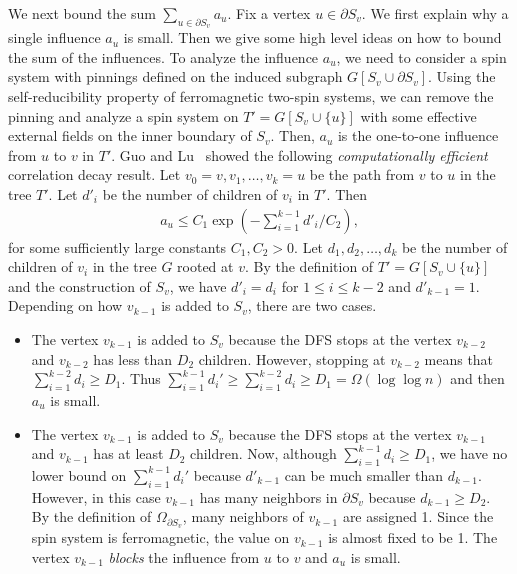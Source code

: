 \documentclass[11pt]{amsart}
\theoremstyle{definition}
\theoremstyle{remark}
\begin{document}
We next bound the sum $\sum_{u \in \partial S_v} a_u$. Fix a vertex $u \in \partial S_v$.
We first explain why a single influence $a_u$ is small. Then we give some high level ideas on how to bound the sum of the influences. To analyze the influence $a_u$, we need to consider a spin system with pinnings defined on the induced subgraph $G[S_v \cup \partial S_v]$. Using the self-reducibility property of ferromagnetic two-spin systems, we can remove the pinning and analyze a spin system on $T' = G[S_v \cup \{u\}]$ with some effective external fields on the inner boundary of $S_v$. Then, $a_u$ is the one-to-one influence from $u$ to $v$ in $T'$. Guo and Lu~\cite{GuoL18} showed the following \emph{computationally efficient} correlation decay result. Let $v_0 = v, v_1, \ldots, v_k = u$ be the path from $v$ to $u$ in the tree $T'$. Let $d'_i$ be the number of children of $v_i$ in $T'$. Then
\begin{align*}
   a_u \leq C_1  \exp\left(-\sum_{i=1}^{k-1}d'_i / C_2\right),
\end{align*}
for some sufficiently large constants $C_1, C_2 > 0$. Let $d_1,d_2,\ldots,d_{k}$ be the number of children of $v_i$ in the tree $G$ rooted at $v$. By the definition of $T' = G[S_v \cup \{u\}]$ and the construction of $S_v$, we have $d'_i = d_i$ for $1\leq i \leq k -2$ and $d'_{k-1} = 1$. 
Depending on how $v_{k-1}$ is added to $S_v$, there are two cases.
\begin{itemize}
    \item The vertex $v_{k-1}$ is added to $S_v$ because the DFS stops at the vertex $v_{k-2}$ and $v_{k-2}$ has less than $ D_2$ children. 
      However, stopping at $v_{k-2}$ means that $\sum_{i=1}^{k-2} d_i \geq D_1$.
      Thus $\sum_{i=1}^{k-1} d_i' \geq \sum_{i=1}^{k-2} d_i \geq D_1 = \Omega(\log \log n)$ and then $a_u$ is small.
    \item The vertex $v_{k-1}$ is added to $S_v$ because the DFS stops at the vertex $v_{k-1}$ and $v_{k-1}$ has at least $D_2$ children.
      Now, although $\sum_{i=1}^{k-1}d_i \geq D_1$, we have no lower bound on $\sum_{i=1}^{k-1} d_i'$ because $d'_{k-1}$ can be much smaller than $d_{k-1}$. However, in this case $v_{k-1}$ has many neighbors in $\partial S_v$ because $d_{k-1} \geq D_2$. By the definition of $\Omega_{\partial S_v}$, many neighbors of $v_{k-1}$ are assigned 1. Since the spin system is ferromagnetic, the value on $v_{k-1}$ is almost  fixed to be 1. The vertex $v_{k-1}$ \emph{blocks} the influence from $u$ to $v$ and $a_u$ is small.
\end{itemize}
\end{document}

